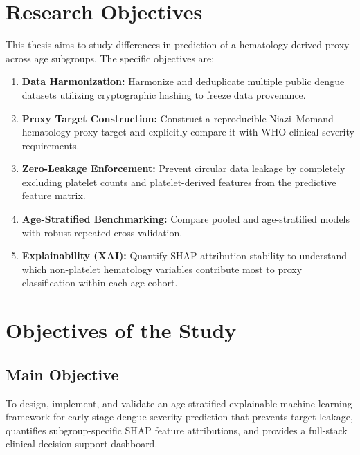 \documentclass[12pt, a4paper]{report}
\begin{document}
\section{Research Objectives}
This thesis aims to study differences in prediction of a hematology-derived proxy across age subgroups. The specific objectives are:
\begin{enumerate}
    \item \textbf{Data Harmonization:} Harmonize and deduplicate multiple public dengue datasets utilizing cryptographic hashing to freeze data provenance.
    \item \textbf{Proxy Target Construction:} Construct a reproducible Niazi--Momand hematology proxy target and explicitly compare it with WHO clinical severity requirements.
    \item \textbf{Zero-Leakage Enforcement:} Prevent circular data leakage by completely excluding platelet counts and platelet-derived features from the predictive feature matrix.
    \item \textbf{Age-Stratified Benchmarking:} Compare pooled and age-stratified models with robust repeated cross-validation.
    \item \textbf{Explainability (XAI):} Quantify SHAP attribution stability to understand which non-platelet hematology variables contribute most to proxy classification within each age cohort.
\end{enumerate}

\section{Objectives of the Study}
\subsection{Main Objective}
To design, implement, and validate an age-stratified explainable machine learning framework for early-stage dengue severity prediction that prevents target leakage, quantifies subgroup-specific SHAP feature attributions, and provides a full-stack clinical decision support dashboard.
\end{document}
